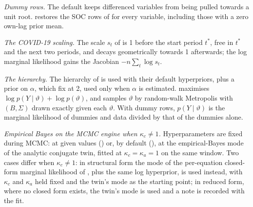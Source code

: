 \emph{Dummy rows.}
The default  keeps differenced variables from being pulled towards a
unit root. %
 restores the SOC rows of \citet{giannone2015prior} for every variable,
including those with a zero own-lag prior mean. %

\emph{The COVID-19 scaling.}
The scale $s_t$ of \citet{lenza2022estimate} is 1 before the start period $t^*$, free in $t^*$ and the
next two periods, and decays geometrically towards 1 afterwards; the log marginal likelihood gains
the Jacobian $-n\sum_t \log s_t$. %

\emph{The hierarchy.}
The hierarchy of \citet{giannone2015prior} is used with their default hyperpriors, plus a prior on
$\alpha$, which \citet{giannone2015prior} fix at 2, used only when $\alpha$ is estimated. %
 maximises $\log p(Y \mid \vartheta) + \log p(\vartheta)$, and  samples
$\vartheta$ by random-walk Metropolis with $(B, \Sigma)$ drawn exactly given each $\vartheta$. %
With dummy rows, $p(Y \mid \vartheta)$ is the marginal likelihood of dummies and data divided by
that of the dummies alone. %

\emph{Empirical Bayes on the MCMC engine when $\kappa_c \neq 1$.}
Hyperparameters are fixed during MCMC: at given values () or, by default
(), at the empirical-Bayes mode of the analytic conjugate twin, fitted at
$\kappa_c = \kappa_a = 1$ on the same window. %
Two cases differ when $\kappa_c \neq 1$: in structural form the mode of the per-equation closed-form marginal likelihood of \citet{chan2022asymmetric},
plus the same log hyperprior, is used instead, with $\kappa_c$ and $\kappa_a$ held fixed and the
twin's mode as the starting point; in reduced form, where no closed form exists, the twin's mode is
used and a note is recorded with the fit. %

